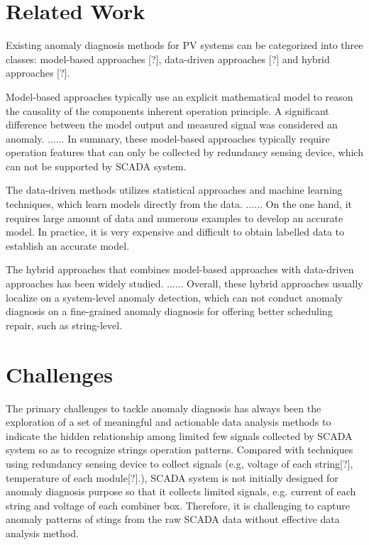 \documentclass[journal]{IEEEtran}
\begin{document}
\section{Related Work}
\label{sctn:related}
Existing anomaly diagnosis methods for PV systems can be categorized into three classes: model-based approaches [?], data-driven approaches [?] and hybrid approaches [?].

Model-based approaches typically use an explicit mathematical model to reason the causality of the components inherent operation principle. A significant difference between the model output and measured signal was considered an anomaly. ...... In summary, these model-based approaches typically require operation features that can only be collected by redundancy sensing device, which can not be supported by SCADA system.

The data-driven methods utilizes statistical approaches and machine learning techniques, which learn models directly from the data. ...... On the one hand, it requires large amount of data and numerous examples to develop an accurate model. In practice, it is very expensive and difficult to obtain labelled data to establish an accurate model.

The hybrid approaches that combines model-based approaches with data-driven approaches has been widely studied. ...... Overall, these hybrid approaches usually localize on a system-level anomaly detection, which can not conduct anomaly diagnosis on a fine-grained anomaly diagnosis for offering better scheduling repair, such as string-level. 

\section{Challenges}
\label{sctn:chllngs}
The primary challenges to tackle anomaly diagnosis has always been the exploration of a set of meaningful and actionable data analysis methods to indicate the hidden relationship among limited few signals collected by SCADA system so as to recognize strings operation patterns. Compared with techniques using redundancy sensing device to collect signals (e.g, voltage of each string[?], temperature of each module[?].), SCADA system is not initially designed for anomaly diagnosis purpose so that it collects limited signals, e.g. current of each string and voltage of each combiner box. Therefore, it is challenging to capture anomaly patterns of stings from the raw SCADA data without effective data analysis method. 
\end{document}
